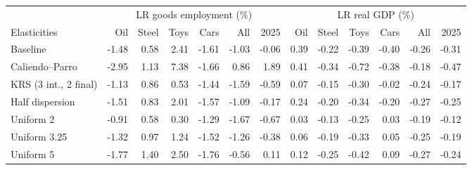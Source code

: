 \begin{tabular}{lrrrrrrrrrrrr}
\toprule
 & \multicolumn{6}{c}{LR goods employment (\%)} & \multicolumn{6}{c}{LR real GDP (\%)} \\
\cmidrule(lr){2-7}\cmidrule(lr){8-13}
Elasticities & Oil & Steel & Toys & Cars & All & 2025 & Oil & Steel & Toys & Cars & All & 2025 \\
\midrule
Baseline & -1.48 & 0.58 & 2.41 & -1.61 & -1.03 & -0.06 & 0.39 & -0.22 & -0.39 & -0.40 & -0.26 & -0.31 \\
Caliendo--Parro & -2.95 & 1.13 & 7.38 & -1.66 & 0.86 & 1.89 & 0.41 & -0.34 & -0.72 & -0.38 & -0.18 & -0.47 \\
KRS (3 int., 2 final) & -1.13 & 0.86 & 0.53 & -1.44 & -1.59 & -0.59 & 0.07 & -0.15 & -0.30 & -0.02 & -0.24 & -0.17 \\
Half dispersion & -1.51 & 0.83 & 2.01 & -1.57 & -1.09 & -0.17 & 0.24 & -0.20 & -0.34 & -0.20 & -0.27 & -0.25 \\
Uniform 2 & -0.91 & 0.58 & 0.30 & -1.29 & -1.67 & -0.67 & 0.03 & -0.13 & -0.25 & 0.03 & -0.19 & -0.12 \\
Uniform 3.25 & -1.32 & 0.97 & 1.24 & -1.52 & -1.26 & -0.38 & 0.06 & -0.19 & -0.33 & 0.05 & -0.25 & -0.19 \\
Uniform 5 & -1.77 & 1.40 & 2.50 & -1.76 & -0.56 & 0.11 & 0.12 & -0.25 & -0.42 & 0.09 & -0.27 & -0.24 \\
\bottomrule
\end{tabular}
